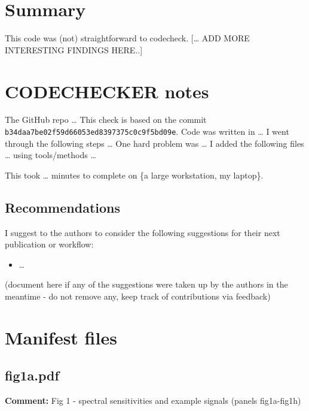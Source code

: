 \documentclass[
  letterpaper,
  DIV=11,
  numbers=noendperiod]{scrartcl}
\providecommand{\tightlist}{%
  \setlength{\itemsep}{0pt}\setlength{\parskip}{0pt}}
\begin{document}
\section{Summary}\label{summary}

This code was (not) straightforward to codecheck. {[}\ldots{} ADD MORE
INTERESTING FINDINGS HERE..{]}

\clearpage

\section{CODECHECKER notes}\label{codechecker-notes}

The GitHub repo \ldots{} This check is based on the commit
\texttt{b34daa7be02f59d66053ed8397375c0c9f5bd09e}. Code was written in
\ldots{} I went through the following steps \ldots{} One hard problem
was \ldots{} I added the following files \ldots{} using tools/methods
\ldots{}

This took \ldots{} minutes to complete on \{a large workstation, my
laptop\}.

\subsection{Recommendations}\label{recommendations}

I suggest to the authors to consider the following suggestions for their
next publication or workflow:

\begin{itemize}
\tightlist
\item
  \ldots{}
\end{itemize}

(document here if any of the suggestions were taken up by the authors in
the meantime - do not remove any, keep track of contributions via
feedback)

\clearpage

\section{Manifest files}\label{manifest-files}

\subsection{fig1a.pdf}\label{fig1a.pdf}

\textbf{Comment:} Fig 1 - spectral sensitivities and example signals
(panels fig1a-fig1h)
\end{document}
